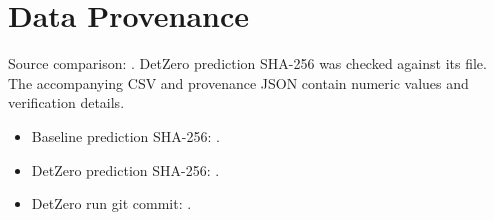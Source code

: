 \documentclass[a4paper,11pt]{article}
\begin{document}
\section{Data Provenance}
Source comparison: . DetZero prediction SHA-256 was checked against its file. The accompanying CSV and provenance JSON contain numeric values and verification details.

\begin{itemize}
\item Baseline prediction SHA-256: {\footnotesize\ttfamily{}}.
\item DetZero prediction SHA-256: {\footnotesize\ttfamily{}}.
\item DetZero run git commit: {\footnotesize\ttfamily{}}.
\end{itemize}
\end{document}
